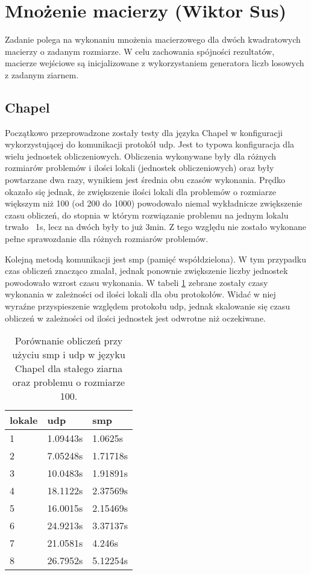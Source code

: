 \section{Mnożenie macierzy (Wiktor Sus)}
    Zadanie polega na wykonaniu mnożenia macierzowego dla dwóch kwadratowych macierzy o zadanym rozmiarze.
    W celu zachowania spójności rezultatów, macierze wejściowe są inicjalizowane z wykorzystaniem generatora liczb losowych z zadanym ziarnem.
    
    \subsection{Chapel}
    Początkowo przeprowadzone zostały testy dla języka Chapel w konfiguracji wykorzystującej do komunikacji protokół udp.
    Jest to typowa konfiguracja dla wielu jednostek obliczeniowych.
    Obliczenia wykonywane były dla różnych rozmiarów problemów i ilości lokali (jednostek obliczeniowych) oraz były powtarzane dwa razy, wynikiem jest średnia obu czasów wykonania.
    Prędko okazało się jednak, że zwiększenie ilości lokali dla problemów o rozmiarze większym niż 100 (od 200 do 1000) powodowało niemal wykładnicze zwiększenie czasu obliczeń, do stopnia w którym rozwiązanie problemu na jednym lokalu trwało ~1s, lecz na dwóch były to już 3min.
    Z tego względu nie zostało wykonane pełne sprawozdanie dla różnych rozmiarów problemów.
    
    Kolejną metodą komunikacji jest smp (pamięć współdzielona).
    W tym przypadku czas obliczeń znacząco zmalał, jednak ponownie zwiększenie liczby jednostek powodowało wzrost czasu wykonania.
    W tabeli \ref{tab:matrixmulchapelcomm} zebrane zostały czasy wykonania w zależności od ilości lokali dla obu protokołów.
    Widać w niej wyraźne przyspieszenie względem protokołu udp, jednak skalowanie się czasu obliczeń w zależności od ilości jednostek jest odwrotne niż oczekiwane.
    
    \begin{table}[]
    \centering
    \begin{tabular}{l|l|l}
    \textbf{lokale} & \textbf{udp} & \textbf{smp} \\ \hline
    1                & 1.09443s     & 1.0625s      \\ \hline
    2                & 7.05248s     & 1.71718s     \\ \hline
    3                & 10.0483s     & 1.91891s     \\ \hline
    4                & 18.1122s     & 2.37569s     \\ \hline
    5                & 16.0015s     & 2.15469s     \\ \hline
    6                & 24.9213s     & 3.37137s     \\ \hline
    7                & 21.0581s     & 4.246s       \\ \hline
    8                & 26.7952s     & 5.12254s    
    \end{tabular}
    \caption{Porównanie obliczeń przy użyciu smp i udp w języku Chapel dla stałego ziarna oraz problemu o rozmiarze 100.}
    \label{tab:matrixmulchapelcomm}
    \end{table}
    
